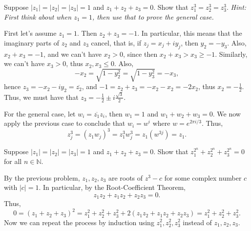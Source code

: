\documentclass[11pt,dvipsnames]{book}
\numberwithin{figure}{section} %
\numberwithin{table}{section} %
\begin{document}
\begin{exercise} Suppose $|z_{1}|=|z_{2}|=|z_{3}|=1$ and $z_{1}+z_{2}+z_{3}=0$. Show that $z_{1}^3=z_{2}^3=z_{3}^3$. {\it Hint: First think about when $z_{1}=1$, then use that to prove the general case.}

\begin{solution}
First let's assume $z_{1}=1$. Then $z_{2}+z_{3}=-1$. In particular, this means that the imaginary parts of $z_{2}$ and $z_{3}$ cancel, that is, if $z_{j}=x_{j}+iy_{j}$, then $y_{2}=-y_{3}$. Also, $x_{2}+x_{3}=-1$, and we can't have $x_{2}>0$, since then $x_{2}+x_{3}>x_{3}\geq -1$. Similarly, we can't have $x_{3}>0$, thus $x_{2},x_{3}\leq 0$. Also,
\[
-x_{2} = \sqrt{1-y_{2}^2} = \sqrt{1-y_{3}^2}= -x_{3},\]
hence $z_{3} = -x_{2} -iy_{2} = \overline{z_{2}}$, and $-1=z_{2}+z_{3}=-x_{2}-x_{2}=-2x_{2}$, thus $x_{2}=-\frac{1}{2}$. Thus, we must have that $z_{3} = -\frac{1}{2}\pm i\frac{\sqrt{3}}{2}$.

For the general case, let $w_{i}=\overline{z_{1}}z_{i}$, then $w_{1}=1$ and $w_{1}+w_{2}+w_{3}=0$. We now apply the previous case to conclude that $w_{i} = w^{i}$ where $w=e^{2\pi i/3}$. Thus,
\[
z_{j}^3 = (z_{1} w_{j})^3 = z_{1}^3 w_{j}^3 = z_{1} (w^{3j})=z_{1}.
\]
\end{solution}
\end{exercise}

\begin{exercise} Suppose $|z_{1}|=|z_{2}|=|z_{3}|=1$ and $z_{1}+z_{2}+z_{3}=0$. Show that $z_{1}^{2^{n}}+z_{2}^{2^{n}}+z_{3}^{2^{n}}=0$ for all $n\in \mathbb{N}$.

\begin{solution}
By the previous problem, $z_1,z_2,z_3$ are roots of $z^3-c$ for some complex number $c$ with $|c|=1$. In particular, by the Root-Coefficient Theorem,
\[
z_{1}z_{2}+z_{1}z_{2}+z_{2}z_{3}=0.
\]
Thus,
\[
0=(z_{1}+z_{2}+z_{3})^2 = z_{1}^2+z_{2}^2+z_{3}^2 + 2(z_{1}z_{2}+z_{1}z_{2}+z_{2}z_{3})=z_{1}^2+z_{2}^2+z_{3}^2 .
\]
Now we can repeat the process by induction using $z_{1}^2,z_{2}^2,z_{3}^2$ instead of $z_1,z_2,z_3$.
\end{solution}

\end{exercise}
\end{document}
